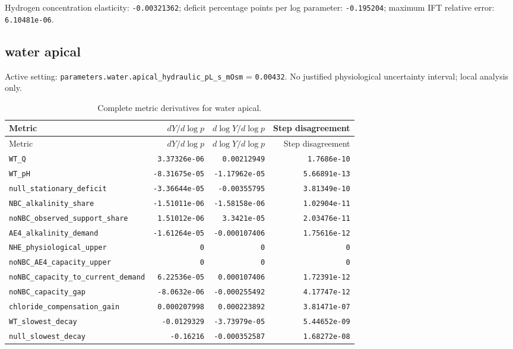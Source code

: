 Hydrogen concentration elasticity: \texttt{-0.00321362}; deficit percentage points per log parameter: \texttt{-0.195204}; maximum IFT relative error: \texttt{6.10481e-06}.\par

\subsection*{water apical}
Active setting: \nolinkurl{parameters.water.apical_hydraulic_pL_s_mOsm} = \texttt{0.00432}. No justified physiological uncertainty interval; local analysis only.


\begingroup\scriptsize
\setlength{\tabcolsep}{3pt}
\begin{longtable}{p{.44\linewidth}rrr}
\caption{Complete metric derivatives for water apical.}\\
\toprule
Metric & $dY/d\log p$ & $d\log Y/d\log p$ & Step disagreement \\
\midrule\endfirsthead
\toprule
Metric & $dY/d\log p$ & $d\log Y/d\log p$ & Step disagreement \\
\midrule\endhead
\bottomrule\endfoot
\nolinkurl{WT_Q} & \texttt{3.37326e-06} & \texttt{0.00212949} & \texttt{1.7686e-10} \\
\nolinkurl{WT_pH} & \texttt{-8.31675e-05} & \texttt{-1.17962e-05} & \texttt{5.66891e-13} \\
\nolinkurl{null_stationary_deficit} & \texttt{-3.36644e-05} & \texttt{-0.00355795} & \texttt{3.81349e-10} \\
\nolinkurl{NBC_alkalinity_share} & \texttt{-1.51011e-06} & \texttt{-1.58158e-06} & \texttt{1.02904e-11} \\
\nolinkurl{noNBC_observed_support_share} & \texttt{1.51012e-06} & \texttt{3.3421e-05} & \texttt{2.03476e-11} \\
\nolinkurl{AE4_alkalinity_demand} & \texttt{-1.61264e-05} & \texttt{-0.000107406} & \texttt{1.75616e-12} \\
\nolinkurl{NHE_physiological_upper} & \texttt{0} & \texttt{0} & \texttt{0} \\
\nolinkurl{noNBC_AE4_capacity_upper} & \texttt{0} & \texttt{0} & \texttt{0} \\
\nolinkurl{noNBC_capacity_to_current_demand} & \texttt{6.22536e-05} & \texttt{0.000107406} & \texttt{1.72391e-12} \\
\nolinkurl{noNBC_capacity_gap} & \texttt{-8.0632e-06} & \texttt{-0.000255492} & \texttt{4.17747e-12} \\
\nolinkurl{chloride_compensation_gain} & \texttt{0.000207998} & \texttt{0.000223892} & \texttt{3.81471e-07} \\
\nolinkurl{WT_slowest_decay} & \texttt{-0.0129329} & \texttt{-3.73979e-05} & \texttt{5.44652e-09} \\
\nolinkurl{null_slowest_decay} & \texttt{-0.16216} & \texttt{-0.000352587} & \texttt{1.68272e-08} \\
\end{longtable}
\endgroup

